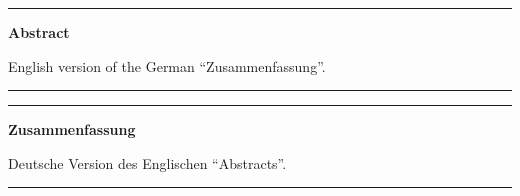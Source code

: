 \documentclass[a4paper,11pt,twoside]{ThesisStyle}
\begin{document}



\dominitoc


\cleardoublepage
\begin{vcenterpage}
\noindent\rule[2pt]{\textwidth}{0.5pt}
\begin{center}
{\large\textbf{Abstract\\}}
\end{center}
English version of the German ``Zusammenfassung''.\\
\noindent\rule[2pt]{\textwidth}{0.5pt}
\end{vcenterpage}

\clearpage
\begin{vcenterpage}
\noindent\rule[2pt]{\textwidth}{0.5pt}
\begin{center}
{\large\textbf{Zusammenfassung\\}}
\end{center}
Deutsche Version des Englischen ``Abstracts''.\\
\noindent\rule[2pt]{\textwidth}{0.5pt}
\end{vcenterpage}



\tableofcontents

\mainmatter







\appendix







\end{document}
